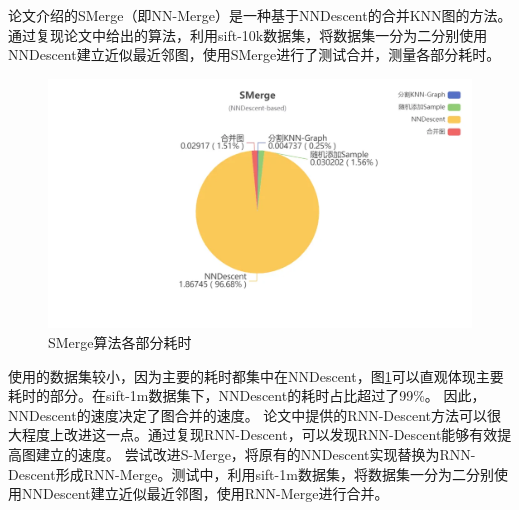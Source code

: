 \documentclass[conference]{IEEEtran}
\begin{document}

论文\cite{zhao2021merge}介绍的SMerge（即NN-Merge）是一种基于NNDescent的合并KNN图的方法。通过复现论文中给出的算法，利用sift-10k数据集，将数据集一分为二分别使用NNDescent建立近似最近邻图，使用SMerge进行了测试合并，测量各部分耗时。

\begin{figure}[H]
    \begin{center}
        \includegraphics[width=1.0\linewidth]{image.png}
        \caption{SMerge算法各部分耗时}
        \label{fig1}
    \end{center}
\end{figure}

使用的数据集较小，因为主要的耗时都集中在NNDescent，图\ref{fig1}可以直观体现主要耗时的部分。在sift-1m数据集下，NNDescent的耗时占比超过了99\%。
因此，NNDescent的速度决定了图合并的速度。
论文\cite{ono2023relative}中提供的RNN-Descent方法可以很大程度上改进这一点。通过复现RNN-Descent，可以发现RNN-Descent能够有效提高图建立的速度。
尝试改进S-Merge，将原有的NNDescent实现替换为RNN-Descent形成RNN-Merge。测试中，利用sift-1m数据集，将数据集一分为二分别使用NNDescent建立近似最近邻图，使用RNN-Merge进行合并。
\end{document}
